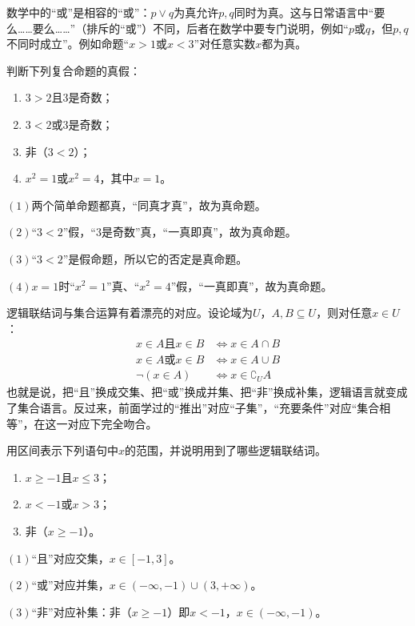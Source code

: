 \begin{zhu}
数学中的“或”是相容的“或”：$p\lor q$为真允许$p,q$同时为真。这与日常语言中“要么……要么……”（排斥的“或”）不同，后者在数学中要专门说明，例如“$p$或$q$，但$p,q$不同时成立”。例如命题“$x>1$或$x<3$”对任意实数$x$都为真。
\end{zhu}

\begin{example}
判断下列复合命题的真假：
\begin{enumerate}
    \item $3>2$且$3$是奇数；
    \item $3<2$或$3$是奇数；
    \item 非（$3<2$）；
    \item $x^2=1$或$x^2=4$，其中$x=1$。
\end{enumerate}
\end{example}
\begin{jie}
    $(1)$两个简单命题都真，“同真才真”，故为真命题。

    $(2)$“$3<2$”假，“$3$是奇数”真，“一真即真”，故为真命题。

    $(3)$“$3<2$”是假命题，所以它的否定是真命题。

    $(4)$$x=1$时“$x^2=1$”真、“$x^2=4$”假，“一真即真”，故为真命题。
\end{jie}

逻辑联结词与集合运算有着漂亮的对应。设论域为$U$，$A,B\subseteq U$，则对任意$x\in U$：
\begin{align*}
    x\in A\text{且}x\in B&\iff x\in A\cap B\\
    x\in A\text{或}x\in B&\iff x\in A\cup B\\
    \neg(x\in A)&\iff x\in \complement_{U}A
\end{align*}
也就是说，把“且”换成交集、把“或”换成并集、把“非”换成补集，逻辑语言就变成了集合语言。反过来，前面学过的“推出”对应“子集”，“充要条件”对应“集合相等”，在这一对应下完全吻合。

\begin{example}
用区间表示下列语句中$x$的范围，并说明用到了哪些逻辑联结词。
\begin{enumerate}
    \item $x\geq -1$且$x\leq 3$；
    \item $x<-1$或$x>3$；
    \item 非（$x\geq -1$）。
\end{enumerate}
\end{example}
\begin{jie}
    $(1)$“且”对应交集，$x\in[-1,3]$。

    $(2)$“或”对应并集，$x\in(-\infty,-1)\cup(3,+\infty)$。

    $(3)$“非”对应补集：非（$x\geq -1$）即$x<-1$，$x\in(-\infty,-1)$。
\end{jie}


